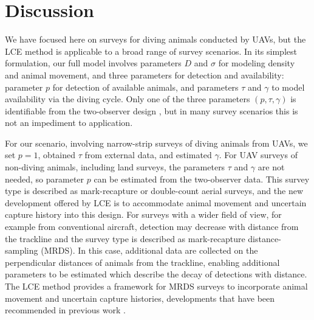 \documentclass[useAMS, usenatbib, referee]{biom}\usepackage[]{graphicx}\usepackage[]{color}
\begin{document}
\section{Discussion\label{sec:discussion}}


We have focused here on surveys for diving animals conducted by UAVs, but the LCE method is applicable to a broad range of survey scenarios. In its simplest formulation, our full model involves parameters $D$ and $\sigma$ for modeling density and animal movement, and three parameters for detection and availability: parameter $p$ for detection of available animals, and parameters $\tau$ and $\gamma$ to model availability via the diving cycle. Only one of the three parameters $(p, \tau, \gamma)$ is identifiable from the two-observer design \citep{Stevenson+al:19}, but in many survey scenarios this is not an impediment to application.

For our scenario, involving narrow-strip surveys of diving animals from UAVs, we set $p=1$, obtained $\tau$ from external data, and estimated $\gamma$. For UAV surveys of non-diving animals, including land surveys, the parameters $\tau$ and $\gamma$ are not needed, so parameter $p$ can be estimated from the two-observer data. This survey type is described as mark-recapture or double-count aerial surveys, and the new development offered by LCE is to accommodate animal movement and uncertain capture history into this design. For surveys with a wider field of view, for example from conventional aircraft, detection may decrease with distance from the trackline and the survey type is described as mark-recapture distance-sampling (MRDS). In this case, additional data are collected on the perpendicular distances of animals from the trackline, enabling additional parameters to be estimated which describe the decay of detections with distance. The LCE method provides a framework for MRDS surveys to incorporate animal movement and uncertain capture histories, developments that have been recommended in previous work \citep{Burt+al:14}.
\end{document}

